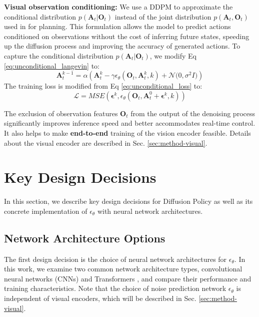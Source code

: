 \textbf{Visual observation conditioning:}
We use a DDPM to approximate the conditional distribution $p(\mathbf{A}_t | \mathbf{O}_t)$ instead of the joint distribution $p(\mathbf{A}_t,\mathbf{O}_t)$ used in \citet{janner2022diffuser} for planning. This formulation allows the model to predict actions conditioned on observations without the cost of inferring future states, speeding up the diffusion process and improving the accuracy of generated actions.
To capture the conditional distribution $p(\mathbf{A}_t |\mathbf{O}_t)$, we modify Eq \ref{eq:unconditional_langevin} to:
\begin{equation}
    \label{eq:diffusion_policy_langevin}
    \mathbf{A}^{k-1}_t = \alpha(\mathbf{A}^k_t - \gamma\epsilon_\theta(\mathbf{O}_t,\mathbf{A}^k_t,k) + \mathcal{N} \bigl(0, \sigma^2 I \bigl))
\end{equation}
The training loss is modified from Eq \ref{eq:unconditional_loss} to:
\begin{equation}
    \label{eq:diffusion_policy_loss}
    \mathcal{L}=MSE(\mathbf{\epsilon}^k,\epsilon_\theta(\mathbf{O}_t, \mathbf{A}^0_t + \mathbf{\epsilon}^k, k))
\end{equation}

The exclusion of observation features $\mathbf{O}_t$ from the output of the denoising process significantly improves inference speed and better accommodates real-time control. It also helps to make \textbf{end-to-end} training of the vision encoder feasible.
Details about the visual encoder are described in Sec. \ref{sec:method-visual}.














\section{Key Design Decisions}
 In this section, we describe key design decisions for Diffusion Policy as well as its concrete implementation of $\epsilon_\theta$ with neural network architectures.

\subsection{Network Architecture Options}
\label{sec:method-network}
The first design decision is the choice of neural network architectures for $\epsilon_\theta$.
In this work, we examine two common network architecture types, convolutional neural networks (CNNs) \cite{ronneberger2015u} and Transformers \cite{vaswani2017attention}, and compare their performance and training characteristics. Note that the choice of noise prediction network $\epsilon_\theta$ is independent of visual encoders, which will be described in Sec. \ref{sec:method-visual}.


